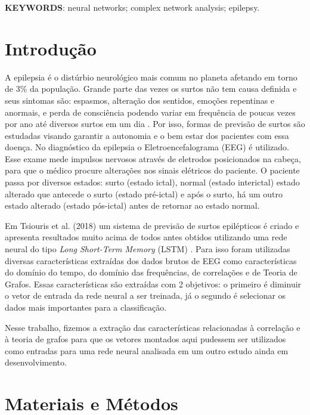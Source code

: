 \documentclass[a4paper,11pt]{article} %
\begin{document}
\vspace{0.5cm}
\noindent\textbf{KEYWORDS}: neural networks; complex network analysis; epilepsy.

\section*{Introdução}

A epilepsia é o distúrbio neurológico mais comum no planeta afetando em torno de 3\% da população. Grande parte das vezes os surtos não tem causa definida e seus sintomas são: espasmos, alteração dos sentidos, emoções repentinas e anormais, e perda de consciência podendo variar em frequência de poucas vezes por ano até diversos surtos em um dia \cite{Kohrman}. Por isso, formas de previsão de surtos são estudadas visando garantir a autonomia e o bem estar dos pacientes com essa doença. No diagnóstico da epilepsia o Eletroencefalograma (EEG) é utilizado. Esse exame mede impulsos nervosos através de eletrodos posicionados na cabeça, para que o médico procure alterações nos sinais elétricos do paciente. O paciente passa por diversos estados: surto (estado ictal), normal (estado interictal) estado alterado que antecede o surto (estado pré-ictal) e após o surto, há um outro estado alterado (estado pós-ictal) antes de retornar ao estado normal. \cite{Scaramelli}

Em Tsiouris et al. (2018) um sistema de previsão de surtos epilépticos é criado e apresenta resultados muito acima de todos antes obtidos utilizando uma rede neural do tipo \textit{Long Short-Term Memory} (LSTM) \cite{Hochreiter}. Para isso foram utilizadas diversas características extraídas dos dados brutos de EEG como características do domínio do tempo, do domínio das frequências, de correlações e de Teoria de Grafos. Essas características são extraídas com 2 objetivos: o primeiro é diminuir o vetor de entrada da rede neural a ser treinada, já o segundo é selecionar os dados mais importantes para a classificação.

Nesse trabalho, fizemos a extração das características relacionadas à correlação e à teoria de grafos para que os vetores montados aqui pudessem ser utilizados como entradas para uma rede neural analisada em um outro estudo ainda em desenvolvimento.


\section*{Materiais e Métodos}
\end{document}
